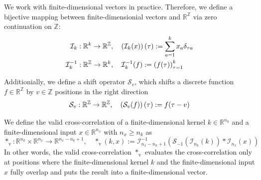 \documentclass[twoside,a4paper]{article}
\begin{document}
We work with finite-dimensional vectors in practice. Therefore, we define a bijective mapping between
finite-dimensionial vectors and $\mathbb{R}^{\mathbb{Z}}$ via zero continuation on $\mathbb{Z}$:
\begin{align*}
	\mathcal{I}_k &: \mathbb{R}^k \to \mathbb{R}^{\mathbb{Z}},
	\quad \left(\mathcal{I}_k(x)\right)(\tau) := \sum_{a=1}^{k} x_a \delta_{\tau a} \\
	\mathcal{I}_k^{-1} &: \mathbb{R}^{\mathbb{Z}} \to \mathbb{R}^k,
	\quad \mathcal{I}_k^{-1}(f) := \left( f(\tau) \right)_{\tau=1}^k
\end{align*}

Additionially, we define a shift operator $\mathcal{S}_v$, 
which shifts a discrete function $f \in \mathbb{R}^\mathbb{Z}$ by $v \in \mathbb{Z}$ positions
in the right direction
\begin{equation*}
	\mathcal{S}_v : \mathbb{R}^{\mathbb{Z}} \to \mathbb{R}^{\mathbb{Z}},
	\quad \left( \mathcal{S}_v(f) \right) (\tau) := f(\tau - v)
\end{equation*}

We define the valid cross-correlation of a finite-dimensional kernel $k \in \mathbb{R}^{n_k}$ and 
a finite-dimensional input $x \in \mathbb{R}^{n_x}$ with $n_x \geq n_k$ as
\begin{equation*}
	*_{\text{v}} : \mathbb{R}^{n_k} \times \mathbb{R}^{n_x} \to \mathbb{R}^{n_x-n_k+1},
	\quad *_{\text{v}}(k,x) := \mathcal{I}_{n_x-n_k+1}^{-1} (
		\mathcal{S}_{-1}( \mathcal{I}_{n_k}(k)) * \mathcal{I}_{n_x}(x)
	)
\end{equation*}
In other words, the valid cross-correlation $*_{\text{v}}$ evaluates the cross-correlation 
only at positions where the finite-dimensional kernel $k$ and the 
finite-dimensional input $x$ fully overlap and puts the result into a finite-dimensional vector.
\end{document}
